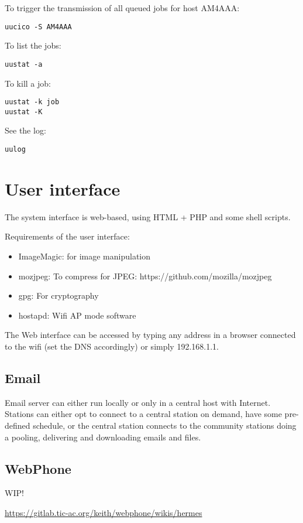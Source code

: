 \documentclass[11pt,a4paper]{article}
\begin{document}
To trigger the transmission of all queued jobs for host
AM4AAA:
\begin{verbatim}
uucico -S AM4AAA
\end{verbatim}

To list the jobs:
\begin{verbatim}
uustat -a
\end{verbatim}

To kill a job:
\begin{verbatim}
uustat -k job
uustat -K
\end{verbatim}

See the log:
\begin{verbatim}
uulog
\end{verbatim}

\section{User interface}

The system interface is web-based, using HTML + PHP and
some shell scripts.

Requirements of the user interface:

\begin{itemize}
\item ImageMagic: for image manipulation
\item mozjpeg: To compress for JPEG: https://github.com/mozilla/mozjpeg
\item gpg: For cryptography
\item hostapd: Wifi AP mode software
\end{itemize}

The Web interface can be accessed by typing any address in a browser
connected to the wifi (set the DNS accordingly) or simply 192.168.1.1.

\subsection{Email}

Email server can either run locally or only in a central host with
Internet. Stations can either opt to connect to a central station on demand,
have some pre-defined schedule, or the central station connects to the
community stations doing a pooling, delivering and downloading emails and
files.

\subsection{WebPhone}

WIP!

\url{https://gitlab.tic-ac.org/keith/webphone/wikis/hermes}
\end{document}
